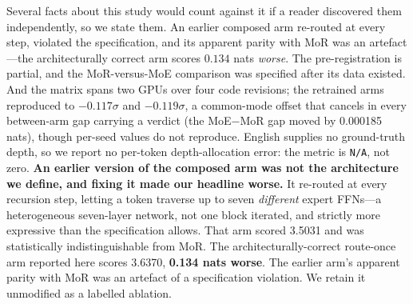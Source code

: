 %
%
Several facts about this study would count against it if a reader discovered them
independently, so we state them. An earlier composed arm re-routed at every step, violated the specification, and its apparent parity with MoR was an artefact---the architecturally correct arm scores $0.134$ nats \emph{worse}. The pre-registration is partial, and the MoR-versus-MoE comparison was specified after its data existed. And the matrix spans two GPUs over four code revisions; the retrained arms reproduced to $-0.117\sigma$ and $-0.119\sigma$, a common-mode offset that cancels in every between-arm gap carrying a verdict (the MoE$-$MoR gap moved by 0.000185 nats), though per-seed values do not reproduce. English supplies no ground-truth depth, so we report no per-token depth-allocation error: the metric is \texttt{N/A}, not zero.
\textbf{An earlier version of the composed arm was not the architecture we define,
and fixing it made our headline worse.} It re-routed at every recursion step,
letting a token traverse up to seven \emph{different} expert FFNs---a heterogeneous
seven-layer network, not one block iterated, and strictly more expressive than the
specification allows. That arm scored 3.5031 and was statistically indistinguishable
from MoR. The architecturally-correct route-once arm reported here scores 3.6370,
\textbf{0.134 nats worse}. The earlier arm's apparent parity with MoR was an
artefact of a specification violation. We retain it unmodified as a labelled
ablation.

